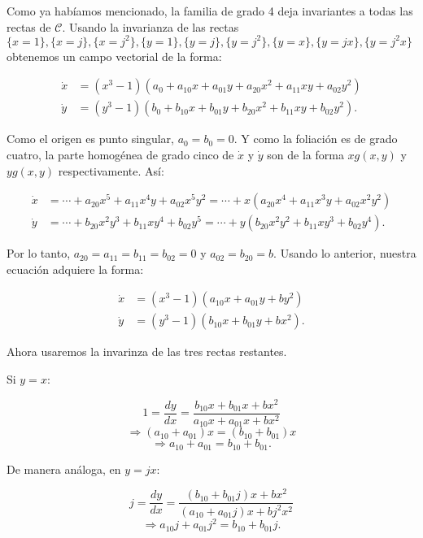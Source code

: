 Como ya habíamos mencionado, la familia de grado 4 deja invariantes a todas las rectas de $\mathcal{C}$. Usando la invarianza de las rectas  $\{x=1\}, \{x=j\}, \{x=j^{2}\}, \{y=1\}, \{y=j\}, \{y=j^{2}\}, \{y=x\}, \{y=jx\}, \{y=j^{2}x\}$ obtenemos un campo vectorial de la forma:



\begin{align*}
\dot{x} & =(x^{3}-1)(a_{0} + a_{10}x + a_{01}y + a_{20}x^{2} + a_{11}xy + a_{02}y^{2}) \\
\dot{y} & =(y^{3}-1)(b_{0} + b_{10}x + b_{01}y + b_{20}x^{2} + b_{11}xy + b_{02}y^{2}).
\end{align*}



Como el origen es punto singular, $a_{0}=b_{0}=0$. Y como la foliación es de grado cuatro, la parte homogénea de grado cinco de $\dot{x}$ y $\dot{y}$ son de la forma $xg(x,y)$ y $yg(x,y)$ respectivamente. Así:


\begin{align*}
\dot{x}& =\cdots+a_{20}x^{5} + a_{11}x^{4}y + a_{02}x^{5}y^{2} =\cdots+x(a_{20}x^{4} + a_{11}x^{3}y + a_{02}x^{2}y^{2}) \\
\dot{y}& =\cdots+b_{20}x^{2}y^{3} + b_{11}xy^{4} + b_{02}y^{5} =\cdots+y(b_{20}x^{2}y^{2} + b_{11}xy^{3} + b_{02}y^{4}) .
\end{align*}

Por lo tanto, $a_{20}=a_{11}=b_{11}=b_{02}=0$ y $a_{02}=b_{20}=b$. Usando lo anterior, nuestra ecuación adquiere la forma:


\begin{align*} 
\dot{x}&=(x^{3}-1)(a_{10}x + a_{01}y + by^{2}) \\
\dot{y}&=(y^{3}-1)(b_{10}x + b_{01}y + bx^{2}).
\end{align*}

Ahora usaremos la invarinza de las tres rectas restantes.

Si $y=x$:

$$ 1 = \frac{dy}{dx} = \frac{b_{10}x + b_{01}x + bx^{2}}{a_{10}x + a_{01}x + bx^{2}}$$
$$\Rightarrow (a_{10} + a_{01})x = (b_{10} + b_{01})x$$
\begin{equation}
\tag{1}
\Rightarrow a_{10}+a_{01}=b_{10}+b_{01}.
\end{equation}

De manera análoga, en $y=jx$:

$$j = \frac{dy}{dx} = \frac{(b_{10}+b_{01}j)x + bx^{2}}{(a_{10}+a_{01}j)x + bj^{2}x^{2}}$$
\begin{equation}
\tag{2}
\Rightarrow a_{10}j + a_{01}j^{2} = b_{10} + b_{01}j.
\end{equation}

